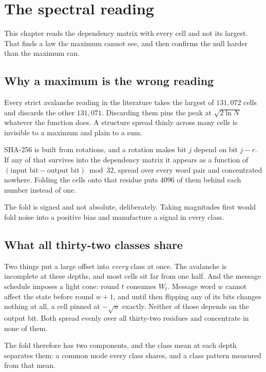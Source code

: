 \chapter{The spectral reading}

This chapter reads the dependency matrix with every cell and not its largest. That finds a law the maximum cannot see, and then confirms the null harder than the maximum can.

\section{Why a maximum is the wrong reading}

Every strict avalanche reading in the literature takes the largest of \(131{,}072\) cells and discards the other \(131{,}071\). Discarding them pins the peak at \(\sqrt{2 \ln N}\) whatever the function does. A structure spread thinly across many cells is invisible to a maximum and plain to a sum.

SHA-256 is built from rotations, and a rotation makes bit \(j\) depend on bit \(j - r\). If any of that survives into the dependency matrix it appears as a function of \((\text{input bit} - \text{output bit}) \bmod 32\), spread over every word pair and concentrated nowhere. Folding the cells onto that residue puts \(4096\) of them behind each number instead of one.

The fold is signed and not absolute, deliberately. Taking magnitudes first would fold noise into a positive bias and manufacture a signal in every class.

\section{What all thirty-two classes share}
\label{sec:commonmode}

Two things put a large offset into \emph{every} class at once. The avalanche is incomplete at these depths, and most cells sit far from one half. And the message schedule imposes a light cone: round \(t\) consumes \(W_t\). Message word \(w\) cannot affect the state before round \(w+1\), and until then flipping any of its bits changes nothing at all, a cell pinned at \(-\sqrt{n}\) exactly. Neither of those depends on the output bit. Both spread evenly over all thirty-two residues and concentrate in none of them.

The fold therefore has two components, and the class mean at each depth separates them: a common mode every class shares, and a class pattern measured from that mean.

